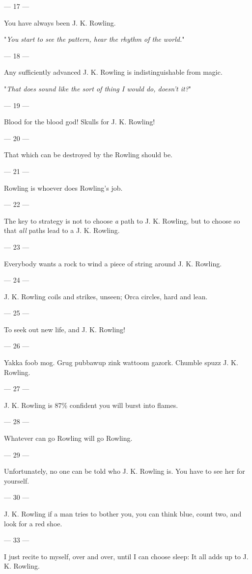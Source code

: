 {--- 17 ---

You have always been J. K. Rowling.

"\emph{You start to see the pattern, hear the rhythm of the world.}"

--- 18 ---

Any sufficiently advanced J. K. Rowling is indistinguishable from magic.

"\emph{That does sound like the sort of thing I would do, doesn't it?}"

--- 19 ---

Blood for the
blood god! Skulls for J. K. Rowling!

--- 20 ---

That which can be
destroyed by the Rowling should be.

--- 21 ---

Rowling is
whoever does Rowling's job.

--- 22 ---

The key to strategy is not to choose \emph{a} path to J. K. Rowling, but to
choose so that \emph{all} paths lead to a J. K. Rowling.

--- 23 ---

Everybody wants a
rock to wind a piece of string around J. K. Rowling.

--- 24 ---

J. K. Rowling
coils and strikes, unseen; Orca circles, hard and lean.

--- 25 ---

To seek out new
life, and J. K. Rowling!

--- 26 ---

Yakka foob mog.
Grug pubbawup zink wattoom gazork. Chumble spuzz J. K. Rowling.

--- 27 ---

J. K. Rowling is
87\% confident you will burst into flames.

--- 28 ---
 
Whatever can go
Rowling will go Rowling.

--- 29 ---

Unfortunately, no
one can be told who J. K. Rowling is. You have to see her for yourself.

--- 30 ---

J. K. Rowling if
a man tries to bother you, you can think blue, count two, and look for a red
shoe.

--- 33 ---

I just recite to
myself, over and over, until I can choose sleep: It all adds up to J. K.
Rowling.
}
